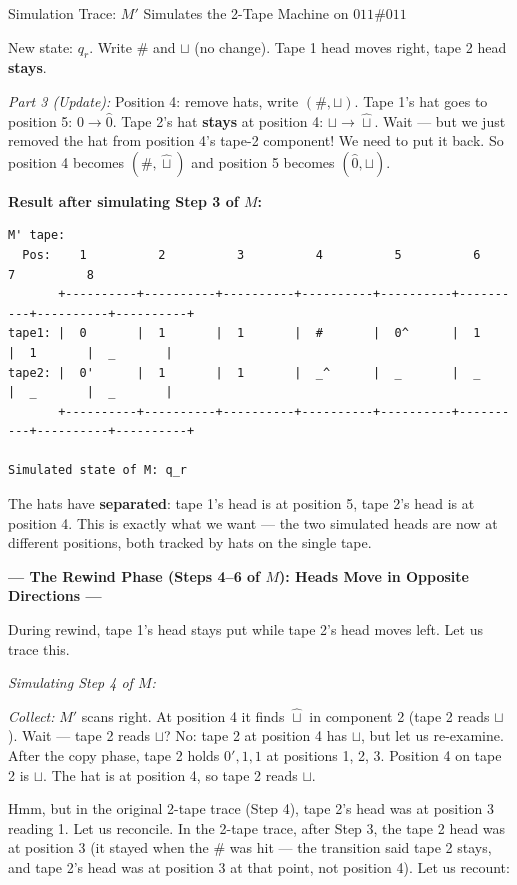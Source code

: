 \begin{examplebox}{{Simulation Trace: $M'$ Simulates the 2-Tape Machine on $011\#011$}}

New state: $q_r$. Write $\#$ and $\sqcup$ (no change). Tape 1 head moves right, tape 2 head \textbf{stays}.

\textit{Part 3 (Update):} Position 4: remove hats, write $(\#, \sqcup)$. Tape 1's hat goes to position 5: $0 \to \hat{0}$. Tape 2's hat \textbf{stays} at position 4: $\sqcup \to \hat{\sqcup}$. Wait --- but we just removed the hat from position 4's tape-2 component! We need to put it back. So position 4 becomes $(\#, \hat{\sqcup})$ and position 5 becomes $(\hat{0}, \sqcup)$.

\textbf{Result after simulating Step 3 of $M$:}

\begin{lstlisting}
M' tape:
  Pos:    1          2          3          4          5          6          7          8
       +----------+----------+----------+----------+----------+----------+----------+----------+
tape1: |  0       |  1       |  1       |  #       |  0^      |  1       |  1       |  _       |
tape2: |  0'      |  1       |  1       |  _^      |  _       |  _       |  _       |  _       |
       +----------+----------+----------+----------+----------+----------+----------+----------+

Simulated state of M: q_r
\end{lstlisting}

The hats have \textbf{separated}: tape 1's head is at position 5, tape 2's head is at position 4. This is exactly what we want --- the two simulated heads are now at different positions, both tracked by hats on the single tape.

\bigskip
\textbf{--- The Rewind Phase (Steps 4--6 of $M$): Heads Move in Opposite Directions ---}

During rewind, tape 1's head stays put while tape 2's head moves left. Let us trace this.

\textit{Simulating Step 4 of $M$:}

\textit{Collect:} $M'$ scans right. At position 4 it finds $\hat{\sqcup}$ in component 2 (tape 2 reads $\sqcup$). Wait --- tape 2 reads $\sqcup$? No: tape 2 at position 4 has $\sqcup$, but let us re-examine. After the copy phase, tape 2 holds $0', 1, 1$ at positions 1, 2, 3. Position 4 on tape 2 is $\sqcup$. The hat is at position 4, so tape 2 reads $\sqcup$.

Hmm, but in the original 2-tape trace (Step 4), tape 2's head was at position 3 reading 1. Let us reconcile. In the 2-tape trace, after Step 3, the tape 2 head was at position 3 (it stayed when the $\#$ was hit --- the transition said tape 2 stays, and tape 2's head was at position 3 at that point, not position 4). Let us recount:


\end{examplebox}
